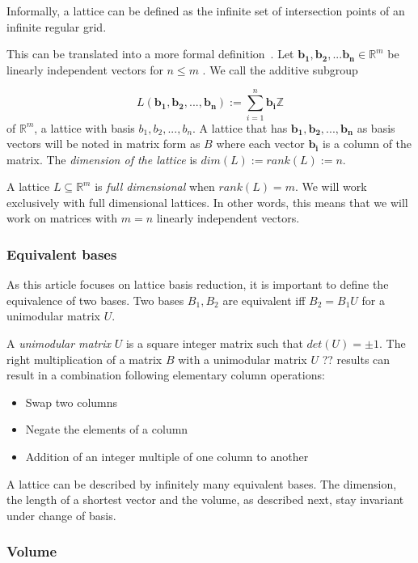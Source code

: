 \documentclass[10pt, a4paper]{article}
\newcommand{\my}[1]{{\color{blue} #1 }}
\renewcommand{\vec}[1]{\mathbf{#1}}
\begin{document}
Informally, a lattice can be defined as the infinite set of intersection points of an infinite regular grid.

This can be translated into a more formal definition~\cite{SchnorrStanfordNotes}.\newline 
Let $\vec{b_1}, \vec{b_2}, ... \vec{b_n} \in \mathbb{R}^m$ be linearly independent vectors \my{for $n\leq m$}. We call the additive subgroup

\[
L(\vec{b_1}, \vec{b_2},..., \vec{b_n}):= \displaystyle\sum_{i=1}^{n} \vec{b_i} \mathbb{Z}
\] of $\mathbb{R}^m$, a lattice with basis $b_1,b_2,...,b_n$.
A lattice that has $\vec{b_1},\vec{b_2},...,\vec{b_n}$ as basis vectors will be noted in matrix form as $B$ where each vector $\vec{b_i}$ is a column of the matrix.
The \emph{dimension of the lattice} is $dim(L) := rank(L) := n$.

A lattice $L \subseteq \mathbb{R}^m$ is \emph{full dimensional} when $rank(L)=m$. We will work exclusively with full dimensional lattices. In other words, this means that we will work on matrices with $m=n$ linearly independent vectors.

\subsubsection{Equivalent bases}

As this article focuses on lattice basis reduction, it is important to define the equivalence of two bases. Two bases $B_1 , B_2$ are equivalent iff $B_2 = B_1 U$ for a unimodular matrix $U$.

A \emph{unimodular matrix} $U$ is a square integer matrix such that $det(U) = \pm 1$. The right multiplication of a matrix $B$ with a unimodular matrix $U$ \my{?? results can result in a combination following} elementary column operations:
\begin{itemize}
\item Swap two columns
\item Negate the elements of a column
\item Addition of an integer multiple of one column to another
\end{itemize}
\my{A lattice can be described by infinitely many equivalent bases. The dimension, the length of a shortest vector and the volume, as described next, stay invariant under change of basis.}
\subsubsection{Volume}
\end{document}
